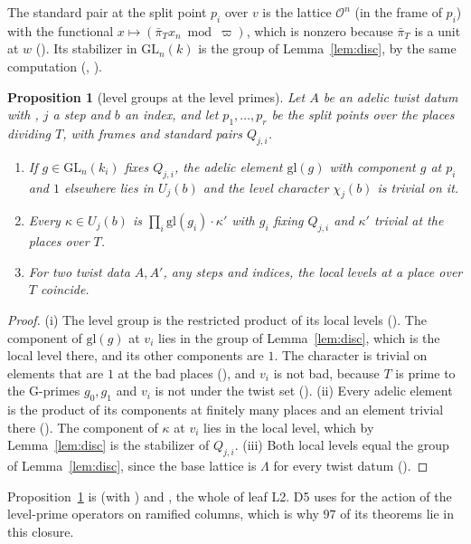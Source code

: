 \documentclass[11pt]{article}
\newcommand{\Ok}{\mathcal O}
\newcommand{\GL}{\mathrm{GL}}
\newcommand{\Lb}{\Lambda}
\newtheorem{proposition}[theorem]{Proposition}
\theoremstyle{definition}
\theoremstyle{remark}
\begin{document}
The standard pair at the split point $p_i$ over $v$ is the lattice $\Ok^n$ (in the frame of $p_i$) with the functional $x\mapsto(\bar\pi_T x_n\bmod\varpi)$, which is nonzero because $\bar\pi_T$ is a unit at $w$ (). Its stabilizer in $\GL_n(k)$ is the group of Lemma~\ref{lem:disc}, by the same computation (, ).

\begin{proposition}[level groups at the level primes]\label{prop:L2}
Let $A$ be an adelic twist datum with , $j$ a step and $b$ an index, and let $p_1,\dots,p_r$ be the split points over the places dividing $T$, with frames and standard pairs $Q_{j,i}$.
\begin{enumerate}[label=(\roman*),itemsep=1pt]
\item If $g\in\GL_n(k_i)$ fixes $Q_{j,i}$, the adelic element $\mathrm{gl}(g)$ with component $g$ at $p_i$ and $1$ elsewhere lies in $U_j(b)$ and the level character $\chi_j(b)$ is trivial on it.
\item Every $\kappa\in U_j(b)$ is $\prod_i\mathrm{gl}(g_i)\cdot\kappa'$ with $g_i$ fixing $Q_{j,i}$ and $\kappa'$ trivial at the places over $T$.
\item For two twist data $A,A'$, any steps and indices, the local levels at a place over $T$ coincide.
\end{enumerate}
\end{proposition}

\begin{proof}
(i) The level group is the restricted product of its local levels (). The component of $\mathrm{gl}(g)$ at $v_i$ lies in the group of Lemma~\ref{lem:disc}, which is the local level there, and its other components are $1$. The character is trivial on elements that are $1$ at the bad places (), and $v_i$ is not bad, because $T$ is prime to the G-primes $g_0,g_1$ and $v_i$ is not under the twist set (). (ii) Every adelic element is the product of its components at finitely many places and an element trivial there (). The component of $\kappa$ at $v_i$ lies in the local level, which by Lemma~\ref{lem:disc} is the stabilizer of $Q_{j,i}$. (iii) Both local levels equal the group of Lemma~\ref{lem:disc}, since the base lattice is $\Lb$ for every twist datum ().
\end{proof}

Proposition~\ref{prop:L2} is  (with ) and , the whole of leaf L2. D5 uses  for the action of the level-prime operators on ramified columns, which is why $97$ of its theorems lie in this closure.
\end{document}
